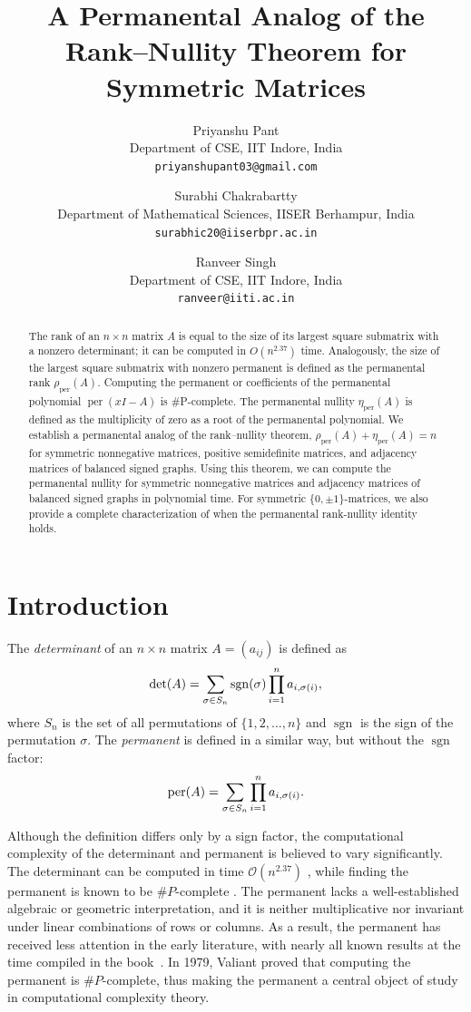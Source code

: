 \documentclass[11pt]{article}
\title{A Permanental Analog of the Rank--Nullity Theorem for Symmetric Matrices}
\author{
Priyanshu Pant\\
Department of CSE, IIT Indore, India\\
\texttt{priyanshupant03@gmail.com}
\and
Surabhi Chakrabartty\\
Department of Mathematical Sciences, IISER Berhampur, India\\
\texttt{surabhic20@iiserbpr.ac.in}
\and
Ranveer Singh\\
Department of CSE, IIT Indore, India\\
\texttt{ranveer@iiti.ac.in}
}
\date{} %
\DeclareMathOperator{\per}{per}
\theoremstyle{plain}
\theoremstyle{definition}
\theoremstyle{remark}
\begin{document}
\maketitle
\begin{abstract}
The rank of an $n \times n$ matrix $A$ is equal to the size of its largest square submatrix with a nonzero determinant; it can be computed in $O(n^{2.37})$ time. Analogously, the size of the largest square submatrix with nonzero permanent is defined as the permanental rank $\rho_{\mathrm{per}}(A)$. Computing the permanent or coefficients of the permanental polynomial $\per(xI-A)$ is \#P-complete.
The permanental nullity  $\eta_{\mathrm{per}}(A)$ is defined as the multiplicity of zero as a root of the permanental polynomial.
We establish a permanental analog of the rank–nullity theorem, $\rho_{\mathrm{per}}(A) + \eta_{\mathrm{per}}(A) = n$ for symmetric nonnegative matrices, positive semidefinite matrices, and adjacency matrices of balanced signed graphs. Using this theorem, we can compute the permanental nullity for symmetric nonnegative matrices and adjacency matrices of balanced signed graphs in polynomial time.
For symmetric $\{0,\pm 1\}$-matrices, we also 
provide a complete characterization of when the permanental rank-nullity identity holds. 
\end{abstract}

\section{Introduction}

The \textit{determinant} of an $n \times n$ matrix $A=(a_{ij})$ is defined as 
\begin{equation}
    \det (A) = \sum_{\sigma \in S_{n}} \operatorname{sgn}(\sigma) \prod_{i=1}^{n} a_{i,\sigma(i)}, \notag
\end{equation}
where $S_n$ is the set of all permutations of $\{1, 2, \ldots, n\}$ and $\operatorname{sgn}$ is the sign of the permutation $\sigma$. The \textit{permanent} is defined in a similar way, but without the $\operatorname{sgn}$ factor:
\begin{equation}
    \per(A) = \sum_{\sigma \in S_{n}} \prod_{i=1}^{n} a_{i,\sigma(i)}. \notag
\end{equation}

Although the definition differs only by a sign factor, the computational complexity of the determinant and permanent is believed to vary significantly. The determinant can be computed in time $\mathcal{O}(n^{2.37})$ \cite{kaltofen2005complexity}, while finding the permanent is known to be $\#P$-complete \cite{valiant1979complexity}. The permanent lacks a well-established algebraic or geometric interpretation, and it is neither multiplicative nor invariant under linear combinations of rows or columns. As a result, the permanent has received less attention in the early literature, with nearly all known results at the time compiled in the book~\cite{minc1984permanents}. In 1979, Valiant \cite{valiant1979complexity} proved that computing the permanent is $\#P$-complete, thus making the permanent a central object of study in computational complexity theory.
\end{document}
